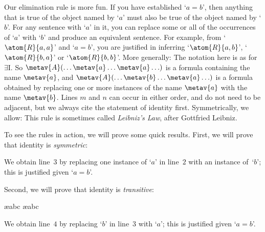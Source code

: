 Our elimination rule is more fun. If you have established `$a=b$', then anything that is true of the object named by `$a$' must also be true of the object named by `$b$'. For any sentence with `$a$' in it, you can replace some or all of the occurrences of `$a$' with `$b$' and produce an equivalent sentence. For example, from `$\atom{R}{a,a}$' and `$a = b$', you are justified in inferring `$\atom{R}{a,b}$', `$\atom{R}{b,a}$' or `$\atom{R}{b,b}$'. More generally:
The notation here is as for $\exists$I. So $\metav{A}(\ldots \metav{a} \ldots \metav{a}\ldots)$ is a formula containing the name $\metav{a}$, and $\metav{A}(\ldots \metav{b} \ldots \metav{a}\ldots)$ is a formula obtained by replacing one or more instances of the name $\metav{a}$ with the name $\metav{b}$. Lines $m$ and $n$ can occur in either order, and do not need to be adjacent, but we always cite the statement of identity first. Symmetrically, we allow:
This rule is sometimes called \emph{Leibniz's Law}, after Gottfried Leibniz.

To see the rules in action, we will prove some quick results. First, we will prove that identity is \emph{symmetric}:
\begin{fitchproof}
	\open
		\AS
	\close
\end{fitchproof}
We obtain line~$3$ by replacing one instance of `$a$' in line~$2$ with an instance of~`$b$'; this is justified given `$a= b$'.

Second, we will prove that identity is \emph{transitive}:
\begin{fitchproof}
	\open
		\AS
		\ae{abc}
		\ae{abc}
	\close
\end{fitchproof}
We obtain line~$4$ by replacing `$b$' in line~$3$ with `$a$'; this is justified given `$a= b$'.

